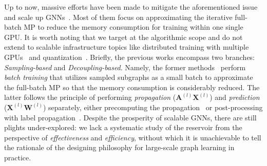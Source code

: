 \message{ !name(main.tex)}\documentclass{article}
\newcommand{\bm}[1]{\mathbf{#1}}
\begin{document}
Up to now, massive efforts have been made to mitigate the aforementioned issue and scale up GNNs~\citep{chiang2019cluster, zeng2019graphsaint, hamilton2017inductive, chen2018fastgcn, zou2019layer, wu2019simplifying, frasca2020sign, sun2021scalable, zhang2021graph}. Most of them focus on approximating the iterative full-batch MP to reduce the memory consumption for training within one single GPU. It is worth noting that we target at the algorithmic scope and do not extend to scalable infrastructure topics like distributed training with multiple GPUs~\citep{bojchevski2020scaling,md2021distgnn} and quantization~\citep{liu2021exact}. Briefly, the previous works encompass two branches: \textit{Sampling-based} and \textit{Decoupling-based}. Namely, the former methods~\citep{hamilton2017inductive, chen2018fastgcn, zeng2019graphsaint, chiang2019cluster, chen2017stochastic, cong2020minimal, huang2018adaptive} perform \textit{batch training} that utilizes sampled
subgraphs as a small batch to approximate the full-batch MP so that the memory consumption is considerably reduced. The latter follows the principle of performing \textit{propagation} (\(\bm{A}^{(l)}\bm{X}^{(l)}\)) and \textit{prediction} (\(\bm{X}^{(l)}\bm{W}^{(l)}\)) separately, either precomputing the propagation~\citep{wu2019simplifying, frasca2020sign, klicpera2018predict, liu2022neighbor2seq, bojchevski2020scaling} or post-processing with label propagation~\citep{sun2021scalable, huang2020combining}. Despite the prosperity of scalable GNNs, there are still plights under-explored:
we lack a systematic study of the reservoir from the perspective of \textit{effectiveness} and \textit{efficiency}, without which it is unachievable to tell the rationale of the designing philosophy for large-scale graph learning in practice.
\end{document}
